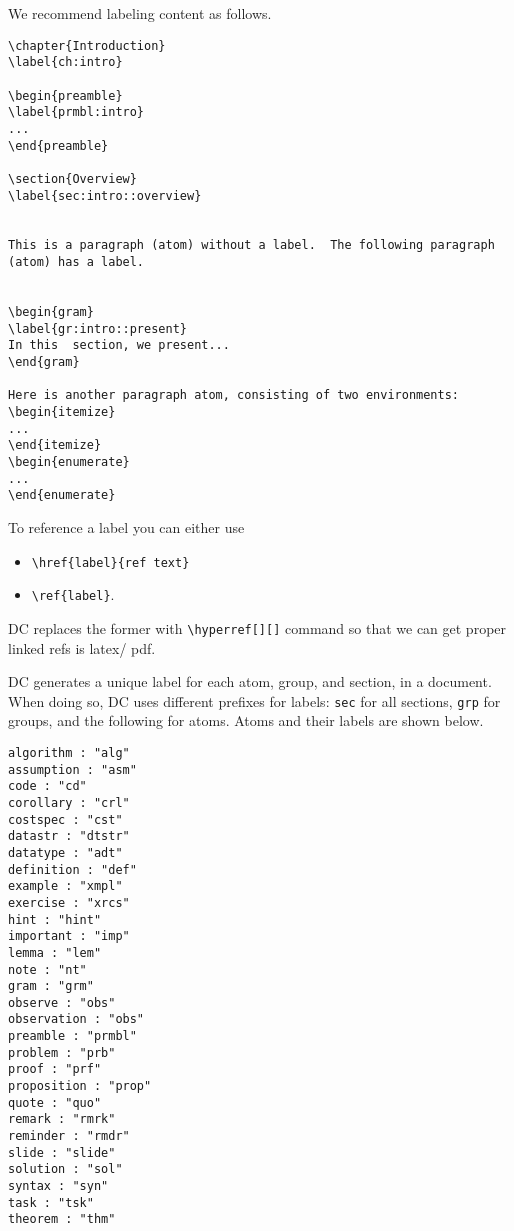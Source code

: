 \begin{example}

We recommend labeling content as follows.

\begin{lstlisting}
\chapter{Introduction}
\label{ch:intro}

\begin{preamble}
\label{prmbl:intro}
...
\end{preamble}

\section{Overview}
\label{sec:intro::overview}


This is a paragraph (atom) without a label.  The following paragraph (atom) has a label.


\begin{gram}
\label{gr:intro::present}
In this  section, we present...
\end{gram}

Here is another paragraph atom, consisting of two environments:
\begin{itemize}
...
\end{itemize}
\begin{enumerate}
...
\end{enumerate}

\end{lstlisting}
\end{example}

\begin{gram}[References]
To reference a label you can either use
\begin{itemize}
\item \lstinline`\href{label}{ref text}`
\item \lstinline`\ref{label}`.
\end{itemize}
%
DC replaces the former with \lstinline`\hyperref[][]` command so that we can get proper linked refs is latex/ pdf.
\end{gram}

DC generates a unique label for each atom, group, and section, in a document.
%
When doing so, DC uses different prefixes for labels: \lstinline`sec` for all sections, \lstinline`grp` for groups, and the following for atoms.   Atoms and their labels are shown below.
%
\begin{lstlisting}
algorithm : "alg"
assumption : "asm"
code : "cd"
corollary : "crl"
costspec : "cst"
datastr : "dtstr"
datatype : "adt"
definition : "def"
example : "xmpl"
exercise : "xrcs"
hint : "hint"
important : "imp"
lemma : "lem"
note : "nt"
gram : "grm"
observe : "obs"
observation : "obs"
preamble : "prmbl"
problem : "prb"
proof : "prf"
proposition : "prop"
quote : "quo"
remark : "rmrk"
reminder : "rmdr"
slide : "slide"
solution : "sol"
syntax : "syn"
task : "tsk"
theorem : "thm"
\end{lstlisting}


